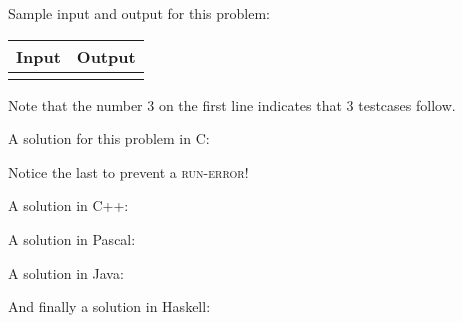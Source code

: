 Sample input and output for this problem:

\begin{tabular}{|p{}|p{}|}
\hline
\textbf{Input} & \textbf{Output} \\
\hline
 &
 \\
\hline
\end{tabular}

Note that the number 3 on the first line indicates that 3 testcases
follow.

A solution for this problem in C:

Notice the last  to prevent a \textsc{run-error}!

\newpage

A solution in C++:

A solution in Pascal:

\newpage

A solution in Java:

And finally a solution in Haskell:


